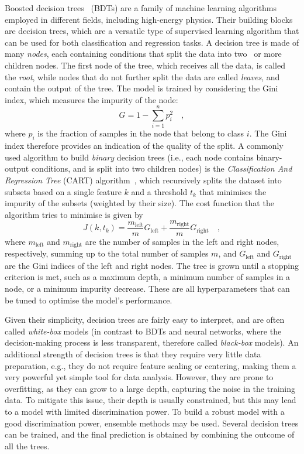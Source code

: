 Boosted decision trees~\cite{friedman2001greedy,freund1997decision} (BDTs) are a family of machine learning algorithms employed in different fields, including high-energy physics. Their building blocks are decision trees, which are a versatile type of supervised learning algorithm that can be used for both classification and regression tasks. A decision tree is made of many \emph{nodes}, each containing conditions that split the data into two~\cite{breiman2017classification} or more~\cite{quinlan1986induction} children nodes. The first node of the tree, which receives all the data, is called the \emph{root}, while nodes that do not further split the data are called \emph{leaves}, and contain the output of the tree. The model is trained by considering the Gini index, which measures the impurity of the node:
\begin{equation*}
    G = 1 - \sum_{i=1}^{n} p_{i}^{2}\quad ,
\end{equation*}
where $p_{i}$ is the fraction of samples in the node that belong to class $i$. The Gini index therefore provides an indication of the quality of the split. A commonly used algorithm to build \emph{binary} decision trees (i.e., each node contains binary-output conditions, and is split into two children nodes) is the \emph{Classification And Regression Tree} (CART) algorithm~\cite{breiman2017classification}, which recursively splits the dataset into subsets based on a single feature $k$ and a threshold $t_k$ that minimises the impurity of the subsets (weighted by their size). The cost function that the algorithm tries to minimise is given by
\begin{equation*}
    J(k,t_k) = \frac{m_{\mathrm{left}}}{m}G_{\mathrm{left}} + \frac{m_{\mathrm{right}}}{m}G_{\mathrm{right}}\quad ,
\end{equation*}
where $m_{\mathrm{left}}$ and $m_{\mathrm{right}}$ are the number of samples in the left and right nodes, respectively, summing up to the total number of samples $m$, and $G_{\mathrm{left}}$ and $G_{\mathrm{right}}$ are the Gini indices of the left and right nodes. The tree is grown until a stopping criterion is met, such as a maximum depth, a minimum number of samples in a node, or a minimum impurity decrease. These are all hyperparameters that can be tuned to optimise the model's performance.

Given their simplicity, decision trees are fairly easy to interpret, and are often called \emph{white-box} models (in contrast to BDTs and neural networks, where the decision-making process is less transparent, therefore called \emph{black-box} models). An additional strength of decision trees is that they require
very little data preparation, e.g., they do not require feature scaling or centering, making them a very powerful yet simple tool for data analysis. However, they are prone to overfitting, as they can grow to a large depth, capturing the noise in the training data. To mitigate this issue, their depth is usually constrained, but this may lead to a model with limited discrimination power. To build a robust model with a good discrimination power, ensemble methods may be used. Several decision trees can be trained, and the final prediction is obtained by combining the outcome of all the trees. 

